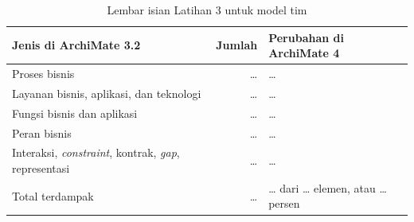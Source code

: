 \begin{table}[!htb]
  \centering
  \caption{Lembar isian Latihan 3 untuk model tim}
  \label{tab:ch04-lat3-hasil}
  \small
  \begin{tabularx}{\textwidth}{>{\raggedright\arraybackslash}p{3.6cm}r>{\raggedright\arraybackslash}X}
    \hline
    \textbf{Jenis di ArchiMate 3.2} & \textbf{Jumlah} & \textbf{Perubahan di ArchiMate 4} \\
    \hline
    Proses bisnis & \dots & \dots \\
    \hline
    Layanan bisnis, aplikasi, dan teknologi & \dots & \dots \\
    \hline
    Fungsi bisnis dan aplikasi & \dots & \dots \\
    \hline
    Peran bisnis & \dots & \dots \\
    \hline
    Interaksi, \textit{constraint}, kontrak, \textit{gap}, representasi & \dots & \dots \\
    \hline
    Total terdampak & \dots & \dots{} dari \dots{} elemen, atau \dots{} persen \\
    \hline
  \end{tabularx}
\end{table}

